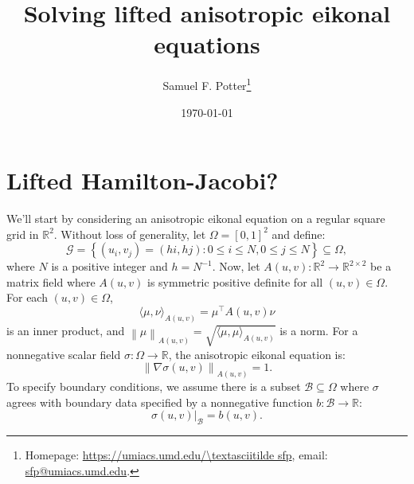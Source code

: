 \documentclass[12pt]{article}
\title{Solving lifted anisotropic eikonal equations}
\author{Samuel F. Potter\footnote{Homepage:
    \url{https://umiacs.umd.edu/\textasciitilde sfp}, email:
    \url{sfp@umiacs.umd.edu}.}}
\date{\today}
\newcommand{\curlyb}[1]{\left\{#1\right\}}
\newcommand{\norm}[1]{\left\|#1\right\|}
\newcommand{\set}[1]{\curlyb{#1}}
\begin{document}
\maketitle

\section{Lifted Hamilton-Jacobi?}

We'll start by considering an anisotropic eikonal equation on a
regular square grid in $\mathbb{R}^2$. Without loss of generality, let
$\Omega = [0, 1]^2$ and define:
\begin{equation}
  \mathcal{G} = \set{(u_i, v_j) = (hi, hj) : 0 \leq i \leq N, 0 \leq j
    \leq N} \subseteq \Omega,
\end{equation}
where $N$ is a positive integer and $h = N^{-1}$. Now, let
$A(u, v) : \mathbb{R}^2 \to \mathbb{R}^{2 \times 2}$ be a matrix field
where $A(u, v)$ is symmetric positive definite for all
$(u, v) \in \Omega$. For each $(u, v) \in \Omega$,
\begin{equation}
  \langle \mu, \nu \rangle_{A(u, v)} = \mu^\top A(u, v) \nu
\end{equation}
is an inner product, and
$\norm{\mu}_{A(u, v)} = \sqrt{\langle \mu, \mu \rangle_{A(u, v)}}$ is
a norm. For a nonnegative scalar field
$\sigma : \Omega \to \mathbb{R}$, the anisotropic eikonal equation is:
\begin{equation}
  \norm{\nabla \sigma(u, v)}_{A(u, v)} = 1.
\end{equation}
To specify boundary conditions, we assume there is a subset
$\mathcal{B} \subseteq \Omega$ where $\sigma$ agrees with boundary
data specified by a nonnegative function
$b : \mathcal{B} \to \mathbb{R}$:
\begin{equation}
  \left. \sigma(u, v) \right|_{\mathcal{B}} = b(u, v).
\end{equation}
\end{document}
